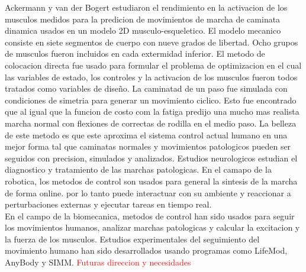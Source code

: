 \documentclass[10pt,onecolumn,twoside,letterpaper]{article}
\begin{document}
Ackermann y van der Bogert estudiaron el rendimiento en la activacion de los musculos medidos para la predicion de movimientos de marcha de caminata dinamica usados en un modelo 2D musculo-esqueletico. El modelo mecanico consiste en siete segmentos de cuerpo con nueve grados de libertad. Ocho grupos de musculos fueron incluidos en cada extermidad inferior. El metodo de colocacion directa fue usado para formular el problema de optimizacion en el cual las variables de estado, los controles y la activacion de los musculos fueron todos tratados como variables de dise\~no. La caminatad de un paso fue simulada con condiciones de simetria para generar un movimiento ciclico. Esto fue encontrado  que al igual que la funcion de costo com la fatiga predijo una mucho mas realista marcha normal con flexiones de correctas de rodilla en el medio paso. La belleza de este metodo es que este aproxima el sistema control actual humano en una mejor forma tal que caminatas normales y movimientos patologicos pueden ser seguidos con precision, simulados y analizados. Estudios neurologicos estudian el diagnostico y tratamiento de las marchas patologicas. En el camapo de la robotica, los metodos de control son usados para general la sintesis de la marcha de forma online. por lo tanto puede interactuar con su ambiente y reaccionar a perturbaciones externas y ejecutar tareas en tiempo real.\cite{Xiang2010}\\
En el campo de la biomecanica, metodos de control han sido usados para seguir los movimientos humanos, analizar marchas patologicas y calcular la excitacion y la fuerza de los musculos. Estudios experimentales del seguimiento del movimiento humano han sido desarrollados usando programas como LifeMod, AnyBody y SIMM.\cite{Xiang2010}
\textcolor{red}{Futuras direccion y necesidades}
\end{document}
